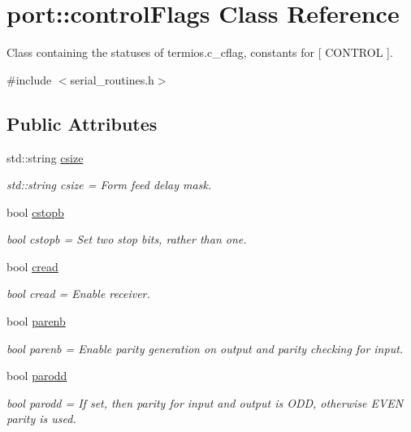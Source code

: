 \hypertarget{classport_1_1controlFlags}{}\section{port\+:\+:control\+Flags Class Reference}
\label{classport_1_1controlFlags}


Class containing the statuses of termios.\+c\+\_\+cflag, constants for \mbox{[} C\+O\+N\+T\+R\+OL \mbox{]}.  




{\ttfamily \#include $<$serial\+\_\+routines.\+h$>$}

\subsection*{Public Attributes}
\begin{DoxyCompactItemize}
\item 
std\+::string \hyperlink{classport_1_1controlFlags_a39ce003580b2d56b84309cd390b03032}{csize}
\begin{DoxyCompactList}\small\item\em std\+::string csize = Form feed delay mask. \end{DoxyCompactList}\item 
bool \hyperlink{classport_1_1controlFlags_a0d87b6aea74b52992afe31351a741be2}{cstopb}
\begin{DoxyCompactList}\small\item\em bool cstopb = Set two stop bits, rather than one. \end{DoxyCompactList}\item 
bool \hyperlink{classport_1_1controlFlags_a8873135a87a62ead09cc4084cbf0efef}{cread}
\begin{DoxyCompactList}\small\item\em bool cread = Enable receiver. \end{DoxyCompactList}\item 
bool \hyperlink{classport_1_1controlFlags_af3c39480a9de7dd42a34d282ca73cdee}{parenb}
\begin{DoxyCompactList}\small\item\em bool parenb = Enable parity generation on output and parity checking for input. \end{DoxyCompactList}\item 
bool \hyperlink{classport_1_1controlFlags_a82805f8b5e019f8d7bb104aac8bf3285}{parodd}
\begin{DoxyCompactList}\small\item\em bool parodd = If set, then parity for input and output is O\+DD, otherwise E\+V\+EN parity is used. \end{DoxyCompactList}\item 

\end{DoxyCompactItemize}
